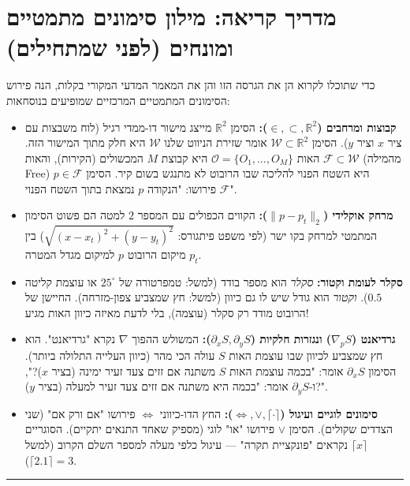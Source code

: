 \documentclass[11pt, a4paper]{article}
\begin{document}
\section*{מדריך קריאה: מילון סימונים מתמטיים ומונחים (לפני שמתחילים)}
כדי שתוכלו לקרוא הן את הגרסה הזו והן את המאמר המדעי המקורי בקלות, הנה פירוש הסימונים המתמטיים המרכזיים שמופיעים בנוסחאות:
\begin{itemize}
    \item \textbf{קבוצות ומרחבים ($\in, \subset, \mathbb{R}^2$):} הסימן $\mathbb{R}^2$ מייצג מישור דו-ממדי רגיל (לוח משבצות עם ציר $x$ וציר $y$). הסימן $\mathcal{W} \subset \mathbb{R}^2$ אומר שזירת הניווט שלנו $\mathcal{W}$ היא חלק מתוך המישור הזה. האות $\mathcal{O} = \{O_1, \dots, O_M\}$ היא קבוצת $M$ המכשולים (הקירות), והאות $\mathcal{F} \subset \mathcal{W}$ (מהמילה \foreignlanguage{english}{Free}) היא השטח הפנוי להליכה שבו הרובוט לא מתנגש בשום קיר. הסימן $p \in \mathcal{F}$ פירושו: "הנקודה $p$ נמצאת בתוך השטח הפנוי $\mathcal{F}$".
    \item \textbf{מרחק אוקלידי ($\|p - p_t\|_2$):} הקווים הכפולים עם המספר $2$ למטה הם פשוט הסימון המתמטי למרחק בקו ישר (לפי משפט פיתגורס: $\sqrt{(x-x_t)^2 + (y-y_t)^2}$) בין מיקום הרובוט $p$ למיקום מגדל המטרה $p_t$.
    \item \textbf{סקלר לעומת וקטור:} \textit{סקלר} הוא מספר בודד (למשל: טמפרטורה של $25^\circ$ או עוצמת קליטה $0.5$). \textit{וקטור} הוא גודל שיש לו גם כיוון (למשל: חץ שמצביע צפון-מזרחה). החיישן של הרובוט מודד רק סקלר (עוצמה), בלי לדעת מאיזה כיוון האות מגיע!
    \item \textbf{גרדיאנט ($\nabla_p S$) ונגזרות חלקיות ($\partial_x S, \partial_y S$):} המשולש ההפוך $\nabla$ נקרא "גרדיאנט". הוא חץ שמצביע לכיוון שבו עוצמת האות $S$ עולה הכי מהר (כיוון העלייה התלולה ביותר). הסימון $\partial_x S$ אומר: "בכמה עוצמת האות $S$ משתנה אם זזים צעד זעיר ימינה (בציר $x$)?", ו-$\partial_y S$ אומר: "בכמה היא משתנה אם זזים צעד זעיר למעלה (בציר $y$)?".
    \item \textbf{סימונים לוגיים ועיגול ($\iff, \lor, \lceil \cdot \rceil$):} החץ הדו-כיווני $\iff$ פירושו "אם ורק אם" (שני הצדדים שקולים). הסימן $\lor$ פירושו "או" לוגי (מספיק שאחד התנאים יתקיים). הסוגריים $\lceil x \rceil$ נקראים "פונקציית תקרה" — עיגול כלפי מעלה למספר השלם הקרוב (למשל $\lceil 2.1 \rceil = 3$).
\end{itemize}

\hrule
\medskip
\end{document}
